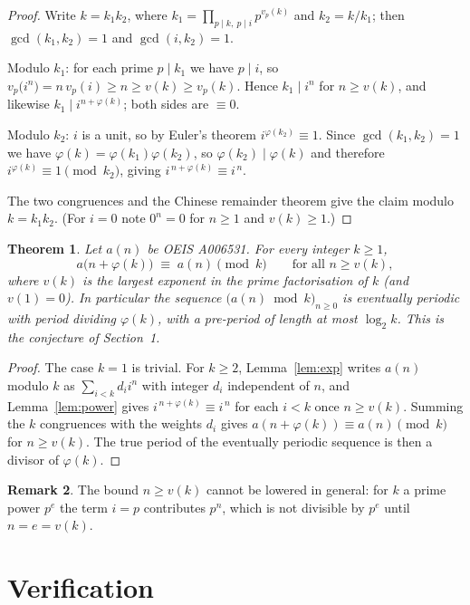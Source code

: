 \documentclass[11pt,a4paper]{article}
\theoremstyle{plain}
\newtheorem{theorem}{Theorem}
\theoremstyle{definition}
\newtheorem{remark}[theorem]{Remark}
\begin{document}
\begin{proof}
Write $k=k_1k_2$, where $k_1=\prod_{p\mid k,\ p\mid i}p^{v_p(k)}$ and $k_2=k/k_1$; then
$\gcd(k_1,k_2)=1$ and $\gcd(i,k_2)=1$.

Modulo $k_1$: for each prime $p\mid k_1$ we have $p\mid i$, so
$v_p\bigl(i^{n}\bigr)=n\,v_p(i)\ge n\ge v(k)\ge v_p(k)$. Hence $k_1\mid i^{n}$ for
$n\ge v(k)$, and likewise $k_1\mid i^{n+\varphi(k)}$; both sides are $\equiv 0$.

Modulo $k_2$: $i$ is a unit, so by Euler's theorem $i^{\varphi(k_2)}\equiv 1$. Since
$\gcd(k_1,k_2)=1$ we have $\varphi(k)=\varphi(k_1)\varphi(k_2)$, so
$\varphi(k_2)\mid\varphi(k)$ and therefore $i^{\varphi(k)}\equiv 1 \pmod{k_2}$, giving
$i^{\,n+\varphi(k)}\equiv i^{\,n}$.

The two congruences and the Chinese remainder theorem give the claim modulo $k=k_1k_2$.
(For $i=0$ note $0^{n}=0$ for $n\ge 1$ and $v(k)\ge1$.)
\end{proof}

\begin{theorem}\label{thm:main}
Let $a(n)$ be OEIS A006531. For every integer $k\ge1$,
\[
a\bigl(n+\varphi(k)\bigr)\;\equiv\;a(n)\pmod{k}\qquad\text{for all } n\ge v(k),
\]
where $v(k)$ is the largest exponent in the prime factorisation of $k$ (and $v(1)=0$).
In particular the sequence $\bigl(a(n)\bmod k\bigr)_{n\ge0}$ is eventually periodic with
period dividing $\varphi(k)$, with a pre-period of length at most $\log_2 k$. This is the
conjecture of Section~1.
\end{theorem}

\begin{proof}
The case $k=1$ is trivial. For $k\ge2$, Lemma~\ref{lem:exp} writes $a(n)$ modulo $k$ as
$\sum_{i<k}d_i i^{n}$ with integer $d_i$ independent of $n$, and Lemma~\ref{lem:power}
gives $i^{\,n+\varphi(k)}\equiv i^{\,n}$ for each $i<k$ once $n\ge v(k)$. Summing the
$k$ congruences with the weights $d_i$ gives
$a(n+\varphi(k))\equiv a(n)\pmod k$ for $n\ge v(k)$. The true period of the eventually
periodic sequence is then a divisor of $\varphi(k)$.
\end{proof}

\begin{remark}
The bound $n\ge v(k)$ cannot be lowered in general: for $k$ a prime power $p^{e}$ the
term $i=p$ contributes $p^{n}$, which is not divisible by $p^{e}$ until $n=e=v(k)$.
\end{remark}

\section{Verification}
\end{document}
